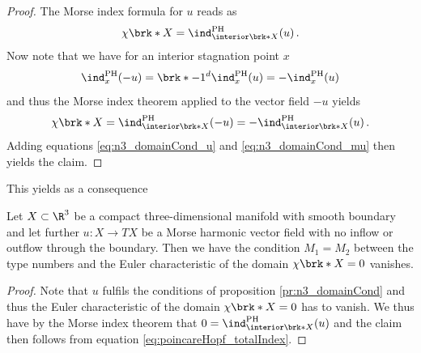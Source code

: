 \begin{proof}
  The Morse index formula for $u$ reads as
  \begin{align}
    \chi\brk*{X}=\ind^\text{PH}_{\interior\brk*{X}}(u)\,.\label{eq:n3_domainCond_u}
  \end{align}
  Now note that we have for an interior stagnation point $x$
  \begin{align*}
    \ind^\text{PH}_{x}(-u)=\brk*{-1}^d\ind^\text{PH}_{x}(u)=-\ind^\text{PH}_{x}(u)
  \end{align*}
  and thus the Morse index theorem applied to the vector field $-u$ yields
  \begin{align}
    \chi\brk*{X}=\ind^\text{PH}_{\interior\brk*{X}}(-u)=-\ind^\text{PH}_{\interior\brk*{X}}(u)\,.\label{eq:n3_domainCond_mu}
  \end{align}
  Adding equations \eqref{eq:n3_domainCond_u} and \eqref{eq:n3_domainCond_mu} then yields the claim.
\end{proof}
This yields as a consequence
\begin{corollary}\label{co:n3_conditionTypeNbrII}
  Let $X\subset\R^3$ be a compact three-dimensional manifold with smooth boundary and let further
  $u\colon X\to TX$ be a Morse harmonic vector field with no
  inflow or outflow through the boundary. Then
  we have the condition $M_1=M_2$ between the type numbers and the Euler characteristic of the domain $\chi\brk*{X}=0$ vanishes.
\end{corollary}
\begin{proof}
  Note that $u$ fulfils the conditions of proposition \ref{pr:n3_domainCond} and thus the Euler characteristic
  of the domain $\chi\brk*{X}=0$ has to vanish.
  We thus have by the Morse index theorem that $0=\ind^\text{PH}_{\interior\brk*{X}}(u)$ and the claim then follows from equation
  \eqref{eq:poincareHopf_totalIndex}.
\end{proof}
